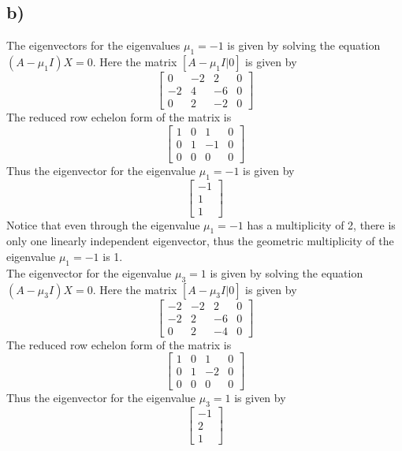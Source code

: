 \documentclass{article}
\begin{document}
\subsection*{b)}
The eigenvectors for the eigenvalues $\mu_1 = -1$ is given by solving the equation $(A - \mu_1 I)X = 0$. Here the matrix $[A - \mu_1 I | 0]$ is given by 
$$\begin{bmatrix}
    0 & -2 & 2 & 0\\
    -2 & 4 & -6 & 0\\
    0 & 2 & -2 &0
\end{bmatrix} $$
The reduced row echelon form of the matrix is
$$\begin{bmatrix}
    1 & 0 & 1 & 0\\
    0 & 1 & -1 & 0\\
    0 & 0 & 0 & 0
\end{bmatrix} $$
Thus the eigenvector for the eigenvalue $\mu_1 = -1$ is given by 
$$\begin{bmatrix}
    -1\\
    1\\
    1
\end{bmatrix} $$
Notice that even through the eigenvalue $\mu_1 = -1$ has a multiplicity of 2, there is only one linearly independent eigenvector, thus the geometric multiplicity of the eigenvalue $\mu_1 = -1$ is 1.
\\
The eigenvector for the eigenvalue $\mu_3 = 1$ is given by solving the equation $(A - \mu_3 I)X = 0$. Here the matrix $[A - \mu_3 I | 0]$ is given by 
$$\begin{bmatrix}
    -2 & -2 & 2 & 0\\
    -2 & 2 & -6 & 0\\
    0 & 2 & -4 &0
\end{bmatrix} $$
The reduced row echelon form of the matrix is
$$\begin{bmatrix}
    1 & 0 & 1 & 0\\
    0 & 1 & -2 & 0\\
    0 & 0 & 0 & 0
\end{bmatrix} $$
Thus the eigenvector for the eigenvalue $\mu_3 = 1$ is given by
$$\begin{bmatrix}
    -1\\
    2\\
    1
\end{bmatrix} $$
\end{document}
